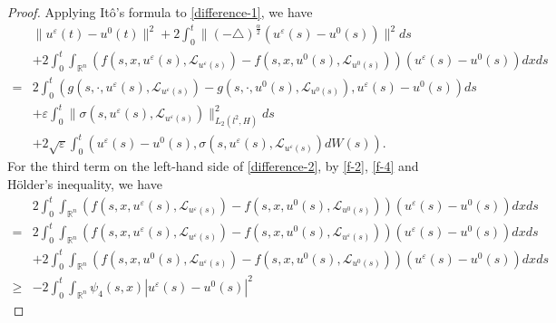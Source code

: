 \documentclass[11pt]{article}
\numberwithin{equation}{section}
\theoremstyle{plain}
\def\geq{\geqslant}
\begin{document}
\begin{proof}
    Applying It\^{o}'s formula to \eqref{difference-1}, we have
    \begin{align} \label{difference-2}
        & \| u^\varepsilon(t) - u^0 (t) \|^2
        + 2 \int_0^t \| (-\triangle)^{\frac{\alpha}{2}} \left( u^\varepsilon(s) - u^0 (s) \right) \|^2 ds
        \nonumber \\
        &  + 2 \int_0^t \int_{\mathbb{R}^n}
        \left( f(s, x, u^\varepsilon(s), \mathcal{L}_{u^\varepsilon(s)} )
        - f(s, x, u^0(s), \mathcal{L}_{u^0(s)} )
        \right)
        \left( u^\varepsilon(s) - u^0 (s)
        \right) dx ds
        \nonumber \\
        = & 2 \int_0^t
        \left( g(s, \cdot, u^\varepsilon(s), \mathcal{L}_{u^\varepsilon (s)} )
        - g(s, \cdot, u^0(s) , \mathcal{L}_{u^0(s)} ),
        u^\varepsilon(s) - u^0 (s)
        \right) ds
        \nonumber \\
        & + \varepsilon
        \int_0^t
        \| \sigma(s, u^\varepsilon (s), \mathcal{L}_{u^\varepsilon (s)} )
        \|_{L_2(l^2,H)}^2 ds
        \nonumber \\
        & + 2 \sqrt{\varepsilon}
        \int_0^t
        \left( u^\varepsilon(s) - u^0 (s),
        \sigma(s, u^\varepsilon (s), \mathcal{L}_{u^\varepsilon (s)} ) dW(s)
        \right).
    \end{align}
    For the third term on the left-hand side of \eqref{difference-2},
    by \eqref{f-2}, \eqref{f-4} and H\"{o}lder's inequality, we have
    \begin{align} \label{difference-3}
        & 2 \int_0^t \int_{\mathbb{R}^n}
        \left( f(s, x, u^\varepsilon(s), \mathcal{L}_{u^\varepsilon(s)} )
        - f(s, x, u^0(s), \mathcal{L}_{u^0(s)} )
        \right)
        \left( u^\varepsilon(s) - u^0 (s)
        \right) dx ds
        \nonumber \\
        = & 2 \int_0^t \int_{\mathbb{R}^n}
        \left( f(s, x, u^\varepsilon(s), \mathcal{L}_{u^\varepsilon(s)} )
        - f(s, x, u^0(s), \mathcal{L}_{u^\varepsilon(s)} )
        \right)
        \left( u^\varepsilon(s) - u^0 (s)
        \right) dx ds
        \nonumber \\
        & + 2 \int_0^t \int_{\mathbb{R}^n}
        \left( f(s, x, u^0(s), \mathcal{L}_{u^\varepsilon(s)} )
        - f(s, x, u^0(s), \mathcal{L}_{u^0(s)} )
        \right)
        \left( u^\varepsilon(s) - u^0 (s)
        \right) dx ds
        \nonumber \\
        \geq & -2 \int_0^t \int_{\mathbb{R}^n}
        \psi_4(s, x) | u^\varepsilon(s) - u^0(s) |^2

\end{align}
\end{proof}
\end{document}
